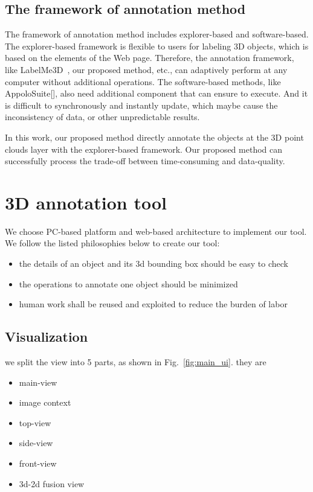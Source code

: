 \documentclass[letterpaper, 10 pt, conference]{ieeeconf}  %
\begin{document}
\subsection{The framework of annotation method}
The framework of annotation method includes explorer-based and software-based. The explorer-based framework is flexible to users for labeling 3D objects, which is based on the elements of the Web page. Therefore, the annotation framework, like LabelMe3D~\cite{LabelMe3D}, our proposed method, etc., can adaptively perform at any computer without additional operations. The software-based methods, like AppoloSuite[], also need additional component that can ensure to execute. And it is difficult to synchronously and instantly update, which maybe cause the inconsistency of data, or other unpredictable results.

In this work, our proposed method directly annotate the objects at the 3D point clouds layer with the explorer-based framework. Our proposed method can successfully process the trade-off between time-consuming and data-quality. 
\section{3D annotation tool}
\label{3D annotation tool}

We choose PC-based platform and web-based architecture to implement our tool. We follow the listed philosophies below to create our tool:

\begin{itemize}
	\item the details of an object and its 3d bounding box should be easy to check
	\item the operations to annotate one object should be minimized
	\item human work shall be reused and exploited to reduce the burden of labor
\end{itemize}

\subsection{Visualization}
we split the view into 5 parts, as shown in Fig.~\ref{fig:main_ui}. they are
\begin{itemize}
	\item main-view 
	\item image context
	\item top-view
	\item side-view
	\item front-view
	\item 3d-2d fusion view
\end{itemize}
\end{document}
